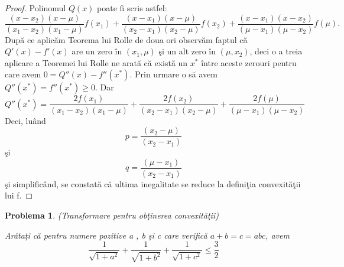 \documentclass[a4paper,12pt,oneside]{report}
\newtheorem{problem}{Problema}
\begin{document}
\begin{proof}
Polinomul \(Q\left ( x \right )\) poate fi scris astfel:
\begin{displaymath}
  \frac{\left ( x - x_{2} \right )\left ( x - \mu  \right )}{\left ( x_{1}  - x_{2}\right )\left ( x_{1} - \mu  \right )} f\left ( x_{1} \right ) + \frac{\left ( x - x_{1} \right )\left ( x - \mu  \right )}{\left ( x_{2}  - x_{1}\right )\left ( x_{2} - \mu  \right )}  f\left ( x_{2} \right ) +  \frac{\left ( x - x_{1} \right )\left ( x - x_{2}  \right )}{\left ( \mu   - x_{1}\right )\left (  \mu - x_{2} \right )}f\left ( \mu \right ).
\end{displaymath}
Dup\u{a} ce aplic\u{a}m Teorema lui Rolle de doua ori observ\u{a}m faptul c\u{a}  \({Q}'\left ( x \right ) - {f}'\left ( x \right )\) are un zero \^{i}n \(\left ( x_{1} , \mu \right )\) \c{s}i un alt zero \^{i}n \(\left ( \mu  , x_{2} \right )\), deci o a treia aplicare a Teoremei lui Rolle ne arat\u{a} c\u{a} exist\u{a} un \(x^{*}\) \^{i}ntre aceste zerouri pentru care avem \(0 = {Q}''\left ( x \right ) - {f}''\left ( x^{*} \right )\). Prin urmare o s\u{a} avem \({Q}''\left ( x^{*}  \right ) = {f}''\left ( x^{*} \right )\geq 0\). Dar
\begin{displaymath}
  {Q}''\left ( x^{*}  \right ) = \frac{2f\left ( x_{1} \right )}{\left ( x_{1} - x_{2} \right )\left ( x_{1} - \mu  \right )} +  \frac{2f\left ( x_{2} \right )}{\left ( x_{2} - x_{1} \right )\left ( x_{2} - \mu  \right )} +  \frac{2f\left (\mu  \right )}{\left ( \mu  - x_{1} \right )\left ( \mu  - x_{2} \right )}
\end{displaymath}
Deci, lu\^{a}nd
\begin{displaymath}
  p = \frac{\left ( x_{2} - \mu  \right )}{\left ( x_{2} - x_{1}\right )}
\end{displaymath}
\c{s}i
\begin{displaymath}
  q = \frac{\left ( \mu  - x_{1} \right )}{\left ( x_{2} - x_{1} \right )}
\end{displaymath}
\c{s}i simplific\^{a}nd, se constat\u{a} c\u{a} ultima inegalitate se reduce la defini\c{t}ia convexit\u{a}\c{t}ii lui f.
\end{proof}
\begin{problem} (Transformare pentru ob\c{t}inerea convexit\u{a}\c{t}ii)

Ar\u{a}ta\c{t}i c\u{a} pentru numere pozitive a , b \c{s}i c care verific\u{a} \(a + b = c = abc\), avem
\begin{displaymath}
  \frac{1}{\sqrt{1 + a^{2}}} + \frac{1}{\sqrt{1 + b^{2}}} + \frac{1}{\sqrt{1 + c^{2}}} \leq \frac{3}{2}
\end{displaymath}
\end{problem}
\end{document}

